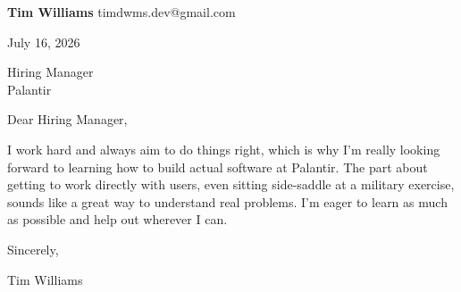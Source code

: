 \documentclass[12pt]{article}
\begin{document}
\textbf{Tim Williams} \hfill timdwms.dev@gmail.com

\vspace{1em}

July 16, 2026

\vspace{1em}

Hiring Manager \\
Palantir

\vspace{1em}

Dear Hiring Manager,

I work hard and always aim to do things right, which is why I'm really looking forward to learning how to build actual software at Palantir. The part about getting to work directly with users, even sitting side-saddle at a military exercise, sounds like a great way to understand real problems. I'm eager to learn as much as possible and help out wherever I can.

\vspace{1em}

Sincerely,

\vspace{2em}

Tim Williams
\end{document}
